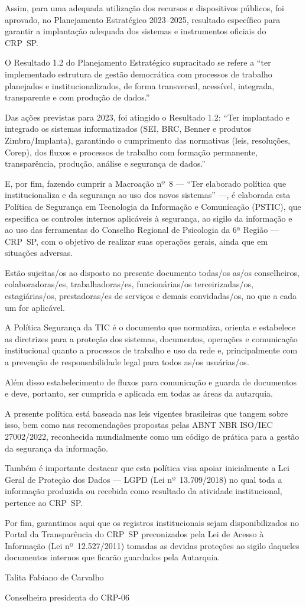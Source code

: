 Assim, para uma adequada utilização dos recursos e dispositivos
públicos, foi aprovado, no Planejamento Estratégico 2023--2025,
resultado específico para garantir a implantação adequada dos sistemas e
instrumentos oficiais do CRP~SP.

O Resultado 1.2 do Planejamento Estratégico supracitado se refere a
``ter implementado estrutura de gestão democrática com processos de
trabalho planejados e institucionalizados, de forma transversal,
acessível, integrada, transparente e com produção de dados.''

Das ações previstas para 2023, foi atingido o Resultado 1.2: ``Ter
implantado e integrado os sistemas informatizados (SEI, BRC, Benner e
produtos Zimbra/Implanta), garantindo o cumprimento das normativas
(leis, resoluções, Corep), dos fluxos e processos de trabalho com
formação permanente, transparência, produção, análise e segurança de
dados.''

E, por fim, fazendo cumprir a Macroação nº~8 --- ``Ter elaborado
política que institucionaliza e da segurança ao uso dos novos sistemas''
---, é elaborada esta Política de Segurança em Tecnologia da Informação
e Comunicação (PSTIC), que especifica os controles internos aplicáveis à
segurança, ao sigilo da informação e ao uso das ferramentas do Conselho
Regional de Psicologia da 6ª Região --- CRP~SP, com o objetivo de
realizar suas operações gerais, ainda que em situações adversas.

Estão sujeitas/os ao disposto no presente documento todas/os as/os
conselheiros, colaboradoras/es, trabalhadoras/es, funcionárias/os
terceirizadas/os, estagiárias/os, prestadoras/es de serviços e demais
convidadas/os, no que a cada um for aplicável.

A Política Segurança da TIC é o documento que normatiza, orienta e
estabelece as diretrizes para a proteção dos sistemas, documentos,
operações e comunicação institucional quanto a processos de trabalho e
uso da rede e, principalmente com a prevenção de responsabilidade legal
para todos as/os usuárias/os.

Além disso estabelecimento de fluxos para comunicação e guarda de
documentos e deve, portanto, ser cumprida e aplicada em todas as áreas
da autarquia.

A presente política está baseada nas leis vigentes brasileiras que
tangem sobre isso, bem como nas recomendações propostas pelas ABNT NBR
ISO/IEC 27002/2022, reconhecida mundialmente como um código de prática
para a gestão da segurança da informação.

Também é importante destacar que esta política visa apoiar inicialmente
a Lei Geral de Proteção dos Dados --- LGPD (Lei nº~13.709/2018) no qual
toda a informação produzida ou recebida como resultado da atividade
institucional, pertence ao CRP~SP.

Por fim, garantimos aqui que os registros institucionais sejam
disponibilizados no Portal da Transparência do CRP~SP preconizados pela
Lei de Acesso à Informação (Lei nº~12.527/2011) tomadas as devidas
proteções ao sigilo daqueles documentos internos que ficarão guardados
pela Autarquia.

Talita Fabiano de Carvalho

Conselheira presidenta do CRP-06